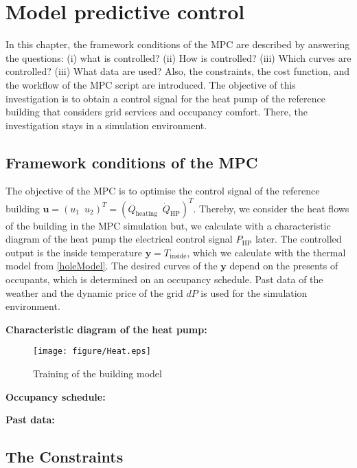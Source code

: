 \chapter{Model predictive control}
\label{ch:mpc}
In this chapter, the framework conditions of the MPC are described by answering the questions: (i) what is controlled? (ii) How is controlled? (iii) Which curves are controlled? (iii) What data are used? Also, the constraints, the cost function, and the workflow of the MPC script are introduced. The objective of this investigation is to obtain a control signal for the heat pump of the reference building that considers grid services and occupancy comfort. There, the investigation stays in a simulation environment. \newline

\section{Framework conditions of the MPC}
\label{section:FrameworkMPC}
The objective of the MPC is to optimise the control signal of the reference building $\mathbf{u} = (u_1 \enspace u_2)^T = (\dot{Q}_\text{heating} \enspace \dot{Q}_\text{HP})^T$. Thereby, we consider the heat flows of the building in the MPC simulation but, we calculate with a characteristic diagram of the heat pump the electrical control signal $P_\text{HP}$ later. The controlled output is the inside temperature $\mathbf{y} = T_\text{inside}$, which we calculate with the thermal model from \autoref{holeModel}. The desired curves of the $\mathbf{y}$ depend on the presents of occupants, which is determined on an occupancy schedule. Past data of the weather and the dynamic price of the grid $dP$  is used for the simulation environment. \newline

\textbf{Characteristic diagram of the heat pump:}\newline
    \begin{figure}[h]
            \centering
            \texttt{[image: figure/Heat.eps]}
           \caption{Training of the building model}
           \label{fig:trainingModel}
    \end{figure}
\textbf{Occupancy schedule:}\newline

\textbf{Past data:}\newline

\section{The Constraints}
\label{section:theconstraints}
